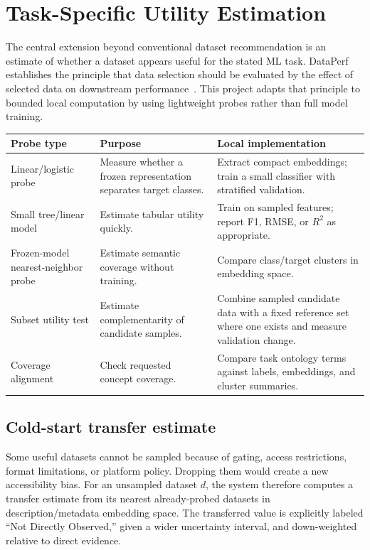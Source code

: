 \documentclass[11pt]{article}
\begin{document}
\section{Task-Specific Utility Estimation}
The central extension beyond conventional dataset recommendation is an estimate of whether a dataset
appears useful for the stated ML task. DataPerf establishes the principle that data selection should be
evaluated by the effect of selected data on downstream performance~\cite{dataperf}. This project adapts
that principle to bounded local computation by using lightweight probes rather than full model training.

\begin{longtable}{@{}L{3.6cm}L{4.2cm}L{5.3cm}@{}}
\toprule
\textbf{Probe type} & \textbf{Purpose} & \textbf{Local implementation} \\
\midrule
\endhead
Linear/logistic probe & Measure whether a frozen representation separates target classes. & Extract compact
  embeddings; train a small classifier with stratified validation. \\
Small tree/linear model & Estimate tabular utility quickly. & Train on sampled features; report F1, RMSE,
  or $R^2$ as appropriate. \\
Frozen-model nearest-neighbor probe & Estimate semantic coverage without training. & Compare class/target
  clusters in embedding space. \\
Subset utility test & Estimate complementarity of candidate samples. & Combine sampled candidate data with
  a fixed reference set where one exists and measure validation change. \\
Coverage alignment & Check requested concept coverage. & Compare task ontology terms against labels,
  embeddings, and cluster summaries. \\
\bottomrule
\end{longtable}

\subsection{Cold-start transfer estimate}
\label{sec:coldstart}
Some useful datasets cannot be sampled because of gating, access restrictions, format limitations, or
platform policy. Dropping them would create a new accessibility bias. For an unsampled dataset $d$, the
system therefore computes a transfer estimate from its nearest already-probed datasets in
description/metadata embedding space. The transferred value is explicitly labeled ``Not Directly
Observed,'' given a wider uncertainty interval, and down-weighted relative to direct evidence.
\end{document}
